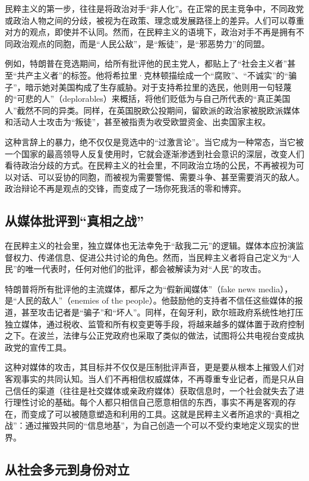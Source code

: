 民粹主义的第一步，往往是将政治对手“非人化”。在正常的民主竞争中，不同政党或政治人物之间的分歧，被视为在政策、理念或发展路径上的差异。人们可以尊重对方的观点，即使并不认同。然而，在民粹主义的语境下，政治对手不再是拥有不同政治观点的同胞，而是“人民公敌”，是“叛徒”，是“邪恶势力”的同盟。

例如，特朗普在竞选期间，给所有批评他的民主党人，都贴上了“社会主义者”甚至“共产主义者”的标签。他将希拉里·克林顿描绘成一个“腐败”、“不诚实”的“骗子”，暗示她对美国构成了生存威胁。对于支持希拉里的选民，他则用一句轻蔑的“可悲的人”（deplorables）来概括，将他们贬低为与自己所代表的“真正美国人”截然不同的异类。同样，在英国脱欧公投期间，留欧派的政治家被脱欧派媒体和活动人士攻击为“叛徒”，甚至被指责为收受欧盟资金、出卖国家主权。

这种言辞上的暴力，绝不仅仅是竞选中的“过激言论”。当它成为一种常态，当它被一个国家的最高领导人反复使用时，它就会逐渐渗透到社会意识的深层，改变人们看待政治分歧的方式。在民粹主义的社会里，不同政治立场的公民，不再被视为可以对话、可以妥协的同胞，而被视为需要警惕、需要斗争、甚至需要消灭的敌人。政治辩论不再是观点的交锋，而变成了一场你死我活的零和博弈。

\subsection{从媒体批评到“真相之战”}

在民粹主义的社会里，独立媒体也无法幸免于“敌我二元”的逻辑。媒体本应扮演监督权力、传递信息、促进公共讨论的角色。然而，当民粹主义者将自己定义为“人民”的唯一代表时，任何对他们的批评，都会被解读为对“人民”的攻击。

特朗普将所有批评他的主流媒体，都斥之为“假新闻媒体”（fake news media），是“人民的敌人”（enemies of the people）。他鼓励他的支持者不信任这些媒体的报道，甚至攻击记者是“骗子”和“坏人”。同样，在匈牙利，欧尔班政府系统性地打压独立媒体，通过税收、监管和所有权变更等手段，将越来越多的媒体置于政府控制之下。在波兰，法律与公正党政府也采取了类似的做法，试图将公共电视台变成执政党的宣传工具。

这种对媒体的攻击，其目标并不仅仅是压制批评声音，更是要从根本上摧毁人们对客观事实的共同认知。当人们不再相信权威媒体，不再尊重专业记者，而是只从自己信任的渠道（往往是社交媒体或亲政府媒体）获取信息时，一个社会就失去了进行理性讨论的基础。每个人都只相信自己愿意相信的东西，事实不再是客观的存在，而变成了可以被随意塑造和利用的工具。这就是民粹主义者所追求的“真相之战”：通过摧毁共同的“信息地基”，为自己创造一个可以不受约束地定义现实的世界。

\subsection{从社会多元到身份对立}

